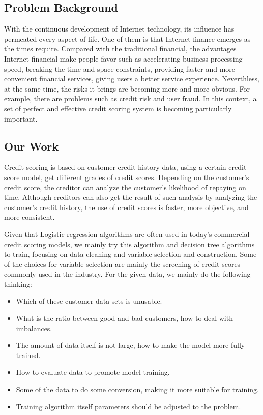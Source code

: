 \documentclass{mcmthesis}
\begin{document}
\subsection{Problem Background}

With the continuous development of Internet technology, its influence has permeated every aspect of life. One of them is that Internet finance emerges as the times require. Compared with the traditional financial, the advantages Internet financial make people favor such as accelerating business processing speed, breaking the time and space constraints, providing faster and more convenient financial services, giving users a better service experience. Neverthless, at the same time, the risks it brings are becoming more and more obvious. For example, there are problems such as credit risk and user fraud. In this context, a set of perfect and effective credit scoring system is becoming particularly important.
\subsection{Our Work}
Credit scoring is based on customer credit history data, using a certain credit score model, get different grades of credit scores. Depending on the customer's credit score, the creditor can analyze the customer's likelihood of repaying on time. Although creditors can also get the result of such analysis by analyzing the customer's credit history, the use of credit scores is faster, more objective, and more consistent.

Given that Logistic regression algorithms are often used in today's commercial credit scoring models, we mainly try this algorithm and decision tree algorithms to train, focusing on data cleaning and variable selection and construction. Some of the choices for variable selection are mainly the screening of credit scores commonly used in the industry. For the given data, we mainly do the following thinking:
\begin{itemize}
\item Which of these customer data sets is unusable.
\item What is the ratio between good and bad customers, how to deal with imbalances.
\item The amount of data itself is not large, how to make the model more fully trained.
\item How to evaluate data to promote model training.
\item Some of the data to do some conversion, making it more suitable for training.
\item Training algorithm itself parameters should be adjusted to the problem.
\end{itemize}
\end{document}
